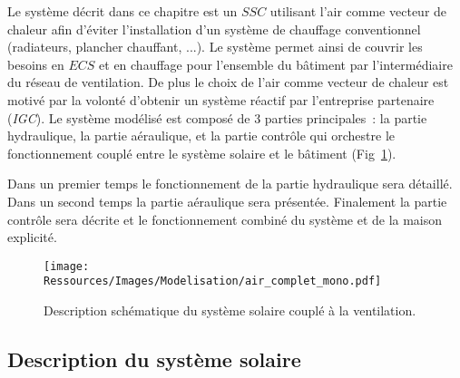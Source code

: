 Le système décrit dans ce chapitre est un $SSC$ utilisant l’air comme vecteur de chaleur
afin d’éviter l’installation d’un système de chauffage conventionnel (radiateurs, plancher chauffant, ...). Le
système permet ainsi de couvrir les besoins en $ECS$ et en chauffage pour l’ensemble du
bâtiment par l’intermédiaire du réseau de ventilation. De plus le choix de l’air comme
vecteur de chaleur est motivé par la volonté d’obtenir un système réactif par l’entreprise partenaire (\emph{IGC}).
Le système modélisé est composé de 3 parties principales~: la partie
hydraulique, la partie aéraulique, et la partie contrôle qui orchestre le fonctionnement
couplé entre le système solaire et le bâtiment (Fig~\ref{fig:air_complet_mono}).

Dans un premier temps le fonctionnement de la partie hydraulique sera détaillé. Dans un
second temps la partie aéraulique sera présentée. Finalement la partie contrôle sera
décrite et le fonctionnement combiné du système et de la maison explicité.

\begin{figure}
    \begin{center}
        \texttt{[image: Ressources/Images/Modelisation/air\_complet\_mono.pdf]}
    \end{center}
    \caption{Description schématique du système solaire couplé à la ventilation.
             \label{fig:air_complet_mono}}
\end{figure}




\subsection{Description du système solaire} %
\label{sub:description_du_systeme_solaire}
